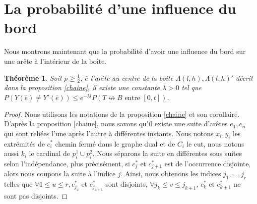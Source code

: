 \documentclass[titlepage,a4paper,12pt]{article}
\newcounter{thm}
\newcounter{prop}
\newcounter{cor}
\newtheorem{cvg}[thm]{Théorème}
\begin{document}
\section{La probabilité d'une influence du bord}

Nous montrons maintenant que la probabilité d'avoir une influence du bord sur une arête à l'intérieur de la boîte. 
\begin{cvg}
Soit $p\geqslant \frac{1}{2}$, $\bar{e}$ l'arête au centre de la boîte $\Lambda(l,h), \Lambda(l,h)'$ décrit dans la proposition \ref{chaine}, il existe une constante $\lambda> 0$ tel que $P(Y(\bar{e})\neq Y'(\bar{e})) \leqslant e^{-\lambda l} P(T\nleftrightarrow B \text{ entre }[0,t])$.
\end{cvg}

\begin{proof}

Nous utilisons les notations de la proposition \ref{chaine} et son corollaire.
D'après la proposition \ref{chaine}, nous savons qu'il existe une suite d'arêtes $e_1,e_n$ qui sont reliées l'une après l'autre à différentes instants. Nous notons $x_i,y_i$ les extrémités de $c_i^*$ chemin fermé dans le graphe dual et de $C_i$ le cut, nous notons aussi $k_i$ le cardinal de $p_i^1\cup p_i^2$. Nous séparons la suite en différentes sous suites selon l'indépendance, plus précisément, si $c^*_j$ et $c^*_{j+1}$  est de l'occurrence disjointe, alors nous coupons la suite à l'indice $j$. Ainsi, nous obtenons les indices $j_1,\dots,j_r$ telles que $\forall 1\leqslant u\leqslant r, c^*_{j_u}$ et $c^*_{j_{u+1}}$ sont disjoints, $\forall j_k \leqslant v \leqslant j_{k+1}$, $c_k^*$ et $c_{k+1}^*$ ne sont pas disjoints.


\end{proof}
\end{document}
